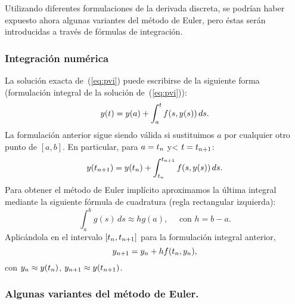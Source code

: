 Utilizando diferentes formulaciones de la derivada discreta, se podrían
haber expuesto ahora algunas variantes del método de Euler, pero éstas
serán introducidas a través de fórmulas de integración.

\subsubsection*{Integración numérica}
La solución exacta de~(\ref{eq:pvi}) puede escribirse de la siguiente
forma (formulación integral de la solución de~(\ref{eq:pvi})):
\begin{equation*}
  y(t) = y(a) + \int_a^t f(s,y(s))\, ds.
\end{equation*}
La formulación anterior sigue siendo válida si sustituimos $a$ por cualquier otro punto de $[a,b]$. En particular, para
$a={t_n}$ y< $t={t_{n+1}}$:
\begin{equation}
  \label{eq:tema4.5}
  y({t_{n+1}}) = y({t_n}) + \int_{t_n}^{t_{n+1}} f(s,y(s))\, ds.
\end{equation}
Para obtener el método de Euler implícito aproximamos la última
integral mediante la siguiente fórmula de cuadratura (regla
rectangular izquierda):
\begin{equation*}
  \int_a^b g(s)\,ds \approx hg(a), \quad \text{ con $h=b-a$}.
\end{equation*}
Aplicándola en el intervalo $[{t_n},{t_{n+1}}]$ para la formulación integral
anterior,
\begin{equation*}
  {y_{n+1}} =  {y_n} + h f({t_n},{y_n}),
\end{equation*}
con ${y_n}\approx y({t_n})$, ${y_{n+1}}\approx y({t_{n+1}})$.



\subsubsection*{Algunas variantes del método de Euler.}

